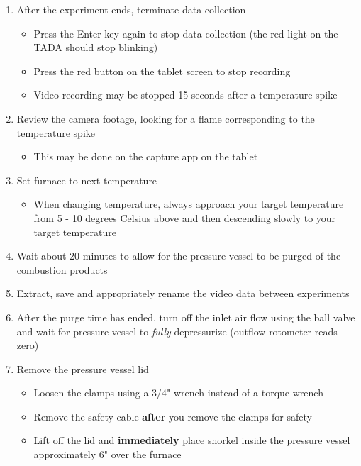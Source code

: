 \documentclass[letterpaper,11pt]{article}
\begin{document}
\begin{enumerate}
    \item After the experiment ends, terminate data collection
        \begin{itemize}
        \item Press the Enter key  again to stop data 
            collection (the red light on the TADA should stop blinking)
        \item Press the red button on the tablet screen to stop recording
        \item Video recording may be stopped 15 seconds after a temperature 
            spike
        \end{itemize}

	\item Review the camera footage, looking for a flame corresponding to the 
        temperature spike
        \begin{itemize}
        \item This may be done on the capture app on the tablet
        \end{itemize}
		
    \item Set furnace to next temperature
        \begin{itemize}
            \item When changing temperature, always approach your target
                temperature from 5 - 10 degrees Celsius above and then 
                descending slowly to your target temperature
        \end{itemize}
    \item Wait about 20 minutes to allow for the pressure 
        vessel to be purged of the combustion products
    \item Extract, save and appropriately rename the video data between 
            experiments
	\item After the purge time has ended, turn off the inlet air flow using the 
		ball valve and wait for pressure vessel to \textit{fully} depressurize 
		(outflow rotometer reads zero)
	\item Remove the pressure vessel lid 
		\begin{itemize}
		\item Loosen the clamps using a 3/4" wrench instead of a 
            torque wrench
		\item Remove the safety cable \textbf{after} you remove the clamps for safety
		\item Lift off the lid and \textbf{immediately} place snorkel inside the 
		pressure vessel approximately 6" over the furnace 
		\end{itemize}
		

\end{enumerate}
\end{document}

